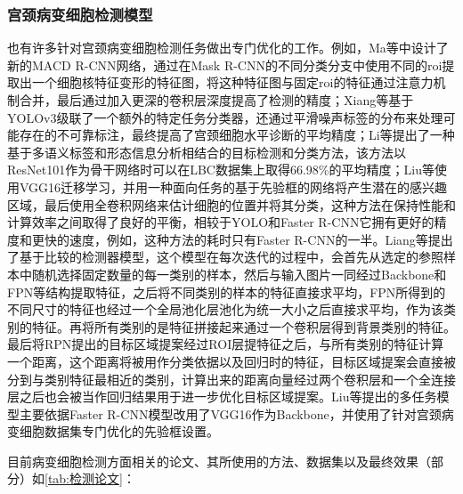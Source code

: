 \subsubsection{宫颈病变细胞检测模型}
\par 也有许多针对宫颈病变细胞检测任务做出专门优化的工作。例如，Ma等\cite{ma2020macd}中设计了新的MACD R-CNN网络，通过在Mask R-CNN的不同分类分支中使用不同的roi提取出一个细胞核特征变形的特征图，将这种特征图与固定roi的特征通过注意力机制合并，最后通过加入更深的卷积层深度提高了检测的精度；Xiang等\cite{xiang2020novel}基于YOLOv3级联了一个额外的特定任务分类器，还通过平滑噪声标签的分布来处理可能存在的不可靠标注，最终提高了宫颈细胞水平诊断的平均精度；Li等\cite{li2019detection}提出了一种基于多语义标签和形态信息分析相结合的目标检测和分类方法，该方法以ResNet101作为骨干网络时可以在LBC数据集上取得66.98\%的平均精度；Liu等\cite{liu2018multitask}使用VGG16迁移学习，并用一种面向任务的基于先验框的网络将产生潜在的感兴趣区域，最后使用全卷积网络来估计细胞的位置并将其分类，这种方法在保持性能和计算效率之间取得了良好的平衡，相较于YOLO和Faster R-CNN它拥有更好的精度和更快的速度，例如，这种方法的耗时只有Faster R-CNN的一半。Liang\cite{liang2018comparison}等提出了基于比较的检测器模型，这个模型在每次迭代的过程中，会首先从选定的参照样本中随机选择固定数量的每一类别的样本，然后与输入图片一同经过Backbone和FPN等结构提取特征，之后将不同类别的样本的特征直接求平均，FPN所得到的不同尺寸的特征也经过一个全局池化层池化为统一大小之后直接求平均，作为该类别的特征。再将所有类别的是特征拼接起来通过一个卷积层得到背景类别的特征。最后将RPN提出的目标区域提案经过ROI层提特征之后，与所有类别的特征计算一个距离，这个距离将被用作分类依据以及回归时的特征，目标区域提案会直接被分到与类别特征最相近的类别，计算出来的距离向量经过两个卷积层和一个全连接层之后也会被当作回归结果用于进一步优化目标区域提案。Liu\cite{liu2018multitask}等提出的多任务模型主要依据Faster R-CNN模型改用了VGG16作为Backbone，并使用了针对宫颈病变细胞数据集专门优化的先验框设置。
\par 目前病变细胞检测方面相关的论文、其所使用的方法、数据集以及最终效果（部分）如\ref{tab:检测论文}：
